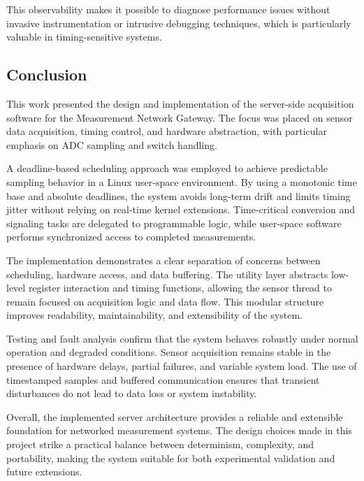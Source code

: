This observability makes it possible to diagnose performance issues without invasive instrumentation or intrusive debugging techniques, which is particularly valuable in timing-sensitive systems.


\subsection{Conclusion}
This work presented the design and implementation of the server-side acquisition software for the Measurement Network Gateway. The focus was placed on sensor data acquisition, timing control, and hardware abstraction, with particular emphasis on ADC sampling and switch handling.

A deadline-based scheduling approach was employed to achieve predictable sampling behavior in a Linux user-space environment. By using a monotonic time base and absolute deadlines, the system avoids long-term drift and limits timing jitter without relying on real-time kernel extensions. Time-critical conversion and signaling tasks are delegated to programmable logic, while user-space software performs synchronized access to completed measurements.

The implementation demonstrates a clear separation of concerns between scheduling, hardware access, and data buffering. The utility layer abstracts low-level register interaction and timing functions, allowing the sensor thread to remain focused on acquisition logic and data flow. This modular structure improves readability, maintainability, and extensibility of the system.

Testing and fault analysis confirm that the system behaves robustly under normal operation and degraded conditions. Sensor acquisition remains stable in the presence of hardware delays, partial failures, and variable system load. The use of timestamped samples and buffered communication ensures that transient disturbances do not lead to data loss or system instability.

Overall, the implemented server architecture provides a reliable and extensible foundation for networked measurement systems. The design choices made in this project strike a practical balance between determinism, complexity, and portability, making the system suitable for both experimental validation and future extensions.

